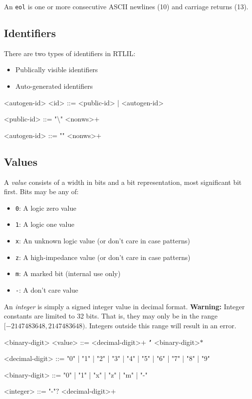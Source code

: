 An \texttt{eol} is one or more consecutive ASCII newlines (10) and carriage returns (13).

\subsection{Identifiers}

There are two types of identifiers in RTLIL:

\begin{itemize}
    \item Publically visible identifiers
    \item Auto-generated identifiers
\end{itemize}

\begin{indentgrammar}{<autogen-id>}
<id> ::= <public-id> | <autogen-id>

<public-id> ::= "\textbackslash" <nonws>$+$

<autogen-id> ::= "\textdollar" <nonws>$+$
\end{indentgrammar}

\subsection{Values}

A \textit{value} consists of a width in bits and a bit representation, most significant bit first. Bits may be any of:
\begin{itemize}
    \item \texttt{0}: A logic zero value
    \item \texttt{1}: A logic one value
    \item \texttt{x}: An unknown logic value (or don't care in case patterns)
    \item \texttt{z}: A high-impedance value (or don't care in case patterns)
    \item \texttt{m}: A marked bit (internal use only)
    \item \texttt{-}: A don't care value
\end{itemize}

An \textit{integer} is simply a signed integer value in decimal format. \textbf{Warning:} Integer constants are limited to 32 bits. That is, they may only be in the range $[-2147483648, 2147483648)$. Integers outside this range will result in an error.

\begin{indentgrammar}{<binary-digit>}
<value> ::= <decimal-digit>$+$ \texttt{\textbf{'}} <binary-digit>$*$

<decimal-digit> ::= "0" | "1" | "2" | "3" | "4" | "5" | "6" | "7" | "8" | "9"

<binary-digit> ::= "0" | "1" | "x" | "z" | "m" | "-"

<integer> ::= "-"$?$ <decimal-digit>$+$
\end{indentgrammar}

